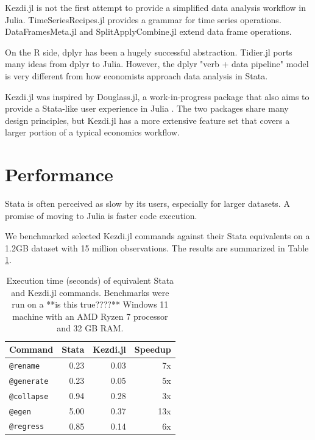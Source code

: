 \documentclass{juliacon}
\begin{document}
Kezdi.jl is not the first attempt to provide a simplified data analysis workflow in Julia. TimeSeriesRecipes.jl \cite{TimeSeriesRecipes2022} provides a grammar for time series operations. DataFramesMeta.jl \cite{DataFramesMeta2023} and SplitApplyCombine.jl \cite{SplitApplyCombine2023} extend data frame operations.

On the R side, dplyr \cite{dplyr2023} has been a hugely successful abstraction. Tidier.jl \cite{tidier2022} ports many ideas from dplyr to Julia. However, the dplyr "verb + data pipeline" model is very different from how economists approach data analysis in Stata.

Kezdi.jl was inspired by Douglass.jl, a work-in-progress package that also aims to provide a Stata-like user experience in Julia \cite{Douglass.jl2023}. The two packages share many design principles, but Kezdi.jl has a more extensive feature set that covers a larger portion of a typical economics workflow.

\section{Performance}

Stata is often perceived as slow by its users, especially for larger datasets. A promise of moving to Julia is faster code execution.

We benchmarked selected Kezdi.jl commands against their Stata equivalents on a 1.2GB dataset with 15 million observations. The results are summarized in Table \ref{tab:benchmark}.

\begin{table}[ht]
	\centering
	\begin{tabular}{lrrr}
		\hline
		Command            & Stata & Kezdi.jl & Speedup \\
		\hline
		\texttt{@rename}   & 0.23  & 0.03     & 7x      \\
		\texttt{@generate} & 0.23  & 0.05     & 5x      \\
		\texttt{@collapse} & 0.94  & 0.28     & 3x      \\
		\texttt{@egen}     & 5.00  & 0.37     & 13x     \\
		\texttt{@regress}  & 0.85  & 0.14     & 6x      \\
		\hline
	\end{tabular}
	\caption{Execution time (seconds) of equivalent Stata and Kezdi.jl commands. Benchmarks were run on a **is this true????** Windows 11 machine with an AMD Ryzen 7 processor and 32 GB RAM.}
	\label{tab:benchmark}
\end{table}
\end{document}
